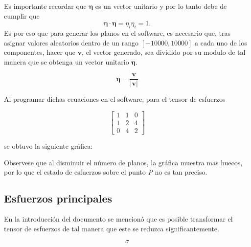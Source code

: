 \documentclass{article}
\begin{document}
    Es importante recordar que $\bm{\eta}$ es un vector unitario y por lo tanto debe de cumplir que
    \begin{equation}
        \bm{\eta}\cdot\bm{\eta} = \eta_{i}\eta_{i} = 1.
    \end{equation}
    Es por eso que para generar los planos en el software, es necesario que, tras asignar valores aleatorios
    dentro de un rango $[-10000, 10000]$ a cada uno de los componentes, hacer que $\bm{v}$, 
    el vector generado, sea dividido por su modulo de tal manera que se obtenga un vector unitario $\bm{\eta}$.

    \begin{equation}
        \bm{\eta} = \frac{\bm{v}}{\lvert \bm{v} \rvert}
    \end{equation}

    Al programar dichas ecuaciones en el software, para el tensor de esfuerzos

    \begin{equation*}
        \begin{bmatrix}
            1 & 1 & 0 \\
            1 & 2 & 4 \\
            0 & 4 & 2
        \end{bmatrix}
    \end{equation*}


    se obtuvo la siguiente gr\'{a}fica:


    Observese que al disminuir el n\'{u}mero de planos, la gr\'{a}fica muestra mas huecos, por
    lo que el estado de esfuerzos sobre el punto \textit{P} no es tan preciso.


    \subsection{Esfuerzos principales}

    En la introducci\'{o}n del documento se mencion\'{o} que es posible transformar el
    tensor de esfuerzos de tal manera que este se reduzca significantemente.

    \begin{equation}
        \sigma
    \end{equation}
\end{document}
